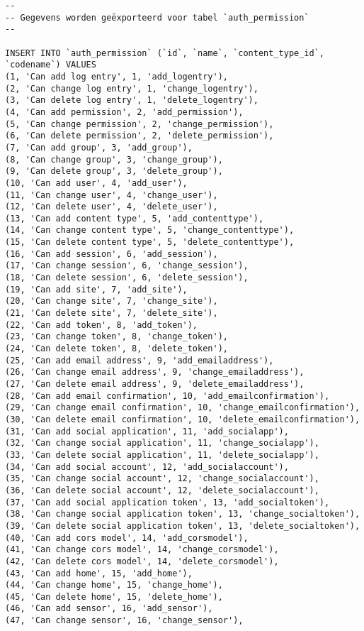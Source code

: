\documentclass[11pt]{article}
\begin{document}
\begin{lstlisting}[style=SQL]
--
-- Gegevens worden geëxporteerd voor tabel `auth_permission`
--

INSERT INTO `auth_permission` (`id`, `name`, `content_type_id`, `codename`) VALUES
(1, 'Can add log entry', 1, 'add_logentry'),
(2, 'Can change log entry', 1, 'change_logentry'),
(3, 'Can delete log entry', 1, 'delete_logentry'),
(4, 'Can add permission', 2, 'add_permission'),
(5, 'Can change permission', 2, 'change_permission'),
(6, 'Can delete permission', 2, 'delete_permission'),
(7, 'Can add group', 3, 'add_group'),
(8, 'Can change group', 3, 'change_group'),
(9, 'Can delete group', 3, 'delete_group'),
(10, 'Can add user', 4, 'add_user'),
(11, 'Can change user', 4, 'change_user'),
(12, 'Can delete user', 4, 'delete_user'),
(13, 'Can add content type', 5, 'add_contenttype'),
(14, 'Can change content type', 5, 'change_contenttype'),
(15, 'Can delete content type', 5, 'delete_contenttype'),
(16, 'Can add session', 6, 'add_session'),
(17, 'Can change session', 6, 'change_session'),
(18, 'Can delete session', 6, 'delete_session'),
(19, 'Can add site', 7, 'add_site'),
(20, 'Can change site', 7, 'change_site'),
(21, 'Can delete site', 7, 'delete_site'),
(22, 'Can add token', 8, 'add_token'),
(23, 'Can change token', 8, 'change_token'),
(24, 'Can delete token', 8, 'delete_token'),
(25, 'Can add email address', 9, 'add_emailaddress'),
(26, 'Can change email address', 9, 'change_emailaddress'),
(27, 'Can delete email address', 9, 'delete_emailaddress'),
(28, 'Can add email confirmation', 10, 'add_emailconfirmation'),
(29, 'Can change email confirmation', 10, 'change_emailconfirmation'),
(30, 'Can delete email confirmation', 10, 'delete_emailconfirmation'),
(31, 'Can add social application', 11, 'add_socialapp'),
(32, 'Can change social application', 11, 'change_socialapp'),
(33, 'Can delete social application', 11, 'delete_socialapp'),
(34, 'Can add social account', 12, 'add_socialaccount'),
(35, 'Can change social account', 12, 'change_socialaccount'),
(36, 'Can delete social account', 12, 'delete_socialaccount'),
(37, 'Can add social application token', 13, 'add_socialtoken'),
(38, 'Can change social application token', 13, 'change_socialtoken'),
(39, 'Can delete social application token', 13, 'delete_socialtoken'),
(40, 'Can add cors model', 14, 'add_corsmodel'),
(41, 'Can change cors model', 14, 'change_corsmodel'),
(42, 'Can delete cors model', 14, 'delete_corsmodel'),
(43, 'Can add home', 15, 'add_home'),
(44, 'Can change home', 15, 'change_home'),
(45, 'Can delete home', 15, 'delete_home'),
(46, 'Can add sensor', 16, 'add_sensor'),
(47, 'Can change sensor', 16, 'change_sensor'),

\end{lstlisting}
\end{document}
